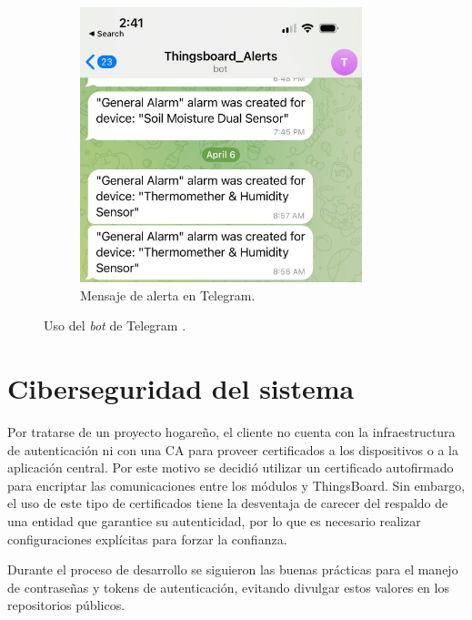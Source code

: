 \begin{figure}[!htpb]
\begin{subfigure}[b]{0.45\textwidth}
	    \includegraphics[width=0.9\textwidth]{./Figures/TB_Alert.jpg}
	     \caption[Mensaje de alerta en Telegram]{Mensaje de alerta en Telegram.}
	     \label{fig:telegram_alerts}
     \end{subfigure}	
	   \hfill
        \caption[Uso del \textit{bot} de Telegram ]{Uso del \textit{bot} de Telegram .}
        \label{fig:Telegram_bot}
\end{figure}








\pagebreak
\section{Ciberseguridad del sistema}
\label{sec:Ciberseguridad del sistema}



Por tratarse de un proyecto hogareño, el cliente no cuenta con la infraestructura de autenticación ni con una CA para proveer certificados a los dispositivos o a la aplicación central.
Por este motivo se decidió utilizar un certificado autofirmado para encriptar las comunicaciones entre los módulos y ThingsBoard. Sin embargo, el uso de este tipo de certificados tiene la desventaja de carecer del respaldo de una entidad que garantice su autenticidad, por lo que es necesario realizar configuraciones explícitas para forzar la confianza.


Durante el proceso de desarrollo se siguieron las buenas prácticas para el manejo de contraseñas y tokens de autenticación, evitando divulgar estos valores en los repositorios públicos.




